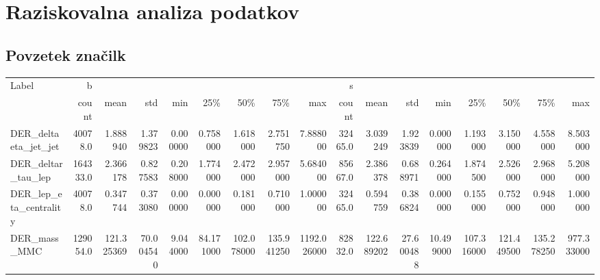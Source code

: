 \appendix
{}
\chapter{Raziskovalna analiza podatkov}



\section{Povzetek značilk}

\begin{table}[ht]
	\centering
	\begin{tabular}{lrrrrrrrrrrrrrrrr}
		\hline
		Label &         b &                &               &                &                &                &                &                &        s &                &               &                &                &                &                &                \\
		{} &     count &           mean &           std &            min &            25\% &            50\% &            75\% &            max &    count &           mean &           std &            min &            25\% &            50\% &            75\% &            max \\
		\hline
		DER\_deltaeta\_jet\_jet        &   40078.0 &       1.888940 &      1.379823 &       0.000000 &       0.758000 &       1.618000 &       2.751750 &       7.888000 &  32465.0 &       3.039249 &      1.923839 &       0.000000 &       1.193000 &       3.150000 &       4.558000 &       8.503000 \\
		DER\_deltar\_tau\_lep          &  164333.0 &       2.366178 &      0.827583 &       0.208000 &       1.774000 &       2.472000 &       2.957000 &       5.684000 &  85667.0 &       2.386378 &      0.688971 &       0.264000 &       1.874500 &       2.526000 &       2.968000 &       5.208000 \\
		DER\_lep\_eta\_centrality      &   40078.0 &       0.347744 &      0.373080 &       0.000000 &       0.000000 &       0.181000 &       0.710000 &       1.000000 &  32465.0 &       0.594759 &      0.386824 &       0.000000 &       0.155000 &       0.752000 &       0.948000 &       1.000000 \\
		DER\_mass\_MMC                &  129054.0 &     121.325369 &     70.004540 &       9.044000 &      84.171000 &     102.078000 &     135.941250 &    1192.026000 &  82832.0 &     122.689202 &     27.600488 &      10.499000 &     107.316000 &     121.449500 &     135.278250 &     977.333000 \\

\end{tabular}
\end{table}
